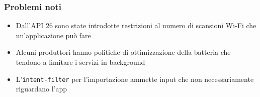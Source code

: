 \documentclass{beamer}
\begin{document}
\begin{frame}
    \frametitle{Problemi noti}

    \begin{itemize}
        \item Dall'API 26 sono state introdotte restrizioni al numero di scansioni Wi-Fi che un'applicazione può fare
        \item Alcuni produttori hanno politiche di ottimizzazione della batteria che tendono a limitare i servizi in background
        \item L'\texttt{intent-filter} per l'importazione ammette input che non necessariamente riguardano l'app
    \end{itemize}
\end{frame}
\end{document}
